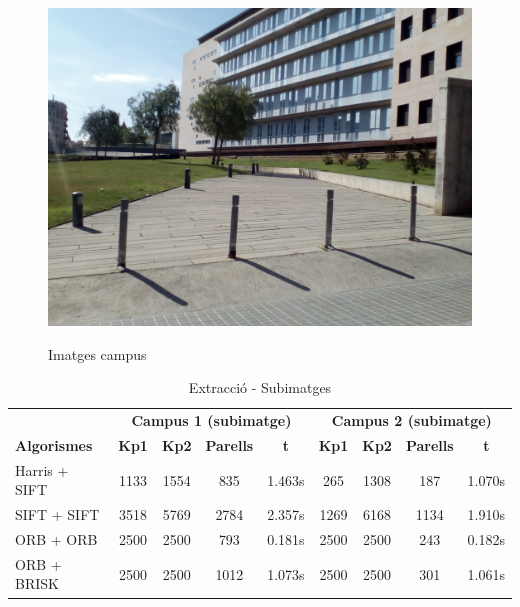 \begin{figure}[!htb]
				\label{fig:awesome_image3}
			\endminipage\hfill
				\includegraphics[width=\linewidth]{images/experiments/uni4}
				\label{fig:awesome_image3}
			\endminipage
			\caption{Imatges campus}
		\end{figure}

		\begin{table}[H]
			\begin{center}
				\begin{tabular}{l | c c c c | c c c c}
					& \multicolumn{4}{c|}{\textbf{Campus 1 (subimatge)}} & \multicolumn{4}{c}{\textbf{Campus 2 (subimatge)}} \\
					\textbf{Algorismes} & \textbf{Kp1} & \textbf{Kp2} & \textbf{Parells} & \textbf{t} & \textbf{Kp1} & \textbf{Kp2} & \textbf{Parells} & \textbf{t} \\ \hline
					Harris + SIFT & 1133 & 1554 & 835 & 1.463s & 265 & 1308 & 187 & 1.070s \\
					SIFT + SIFT & 3518 & 5769 & 2784 & 2.357s & 1269 & 6168 & 1134 & 1.910s \\
					ORB + ORB & 2500 & 2500 & 793 & 0.181s & 2500 & 2500 & 243 & 0.182s \\
					ORB + BRISK & 2500 & 2500 & 1012 & 1.073s & 2500 & 2500 & 301 & 1.061s \\
				\end{tabular}
			\end{center}
			\caption{Extracció - Subimatges}
		\end{table}

